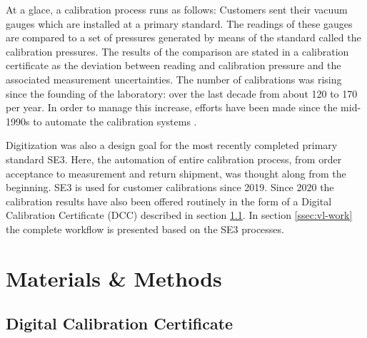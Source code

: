 \documentclass[3p,times,procedia]{elsarticle}
\begin{document}
At a glace, a calibration process runs as follows: Customers sent
their vacuum gauges which are installed at a primary standard. The
readings of these gauges are compared to a set of pressures generated
by means of the standard called the calibration pressures. The
results of the comparison are stated in a calibration certificate
as the deviation between reading and calibration pressure and the associated
measurement uncertainties. The number of calibrations was rising since the
founding of the laboratory: over the last decade from about 120 to
170 per year.  In order to manage this increase, efforts have been
made since the mid-1990s to automate the calibration systems
\cite{jouce3, joufm3}.

Digitization was also a design goal for the most
recently completed primary standard SE3. Here, the automation of
entire calibration process, from order acceptance to measurement and
return shipment, was thought along from the beginning. SE3 is used for
customer calibrations since 2019. Since 2020 the calibration results
have also been offered routinely in the form of a Digital Calibration
Certificate (DCC) described in section \ref{ssec:dcc}.  In section
\ref{ssec:vl-work} the complete workflow is presented based on the SE3
processes.




    


\section{Materials \& Methods}

\subsection{Digital Calibration Certificate}
\label{ssec:dcc}
\end{document}
